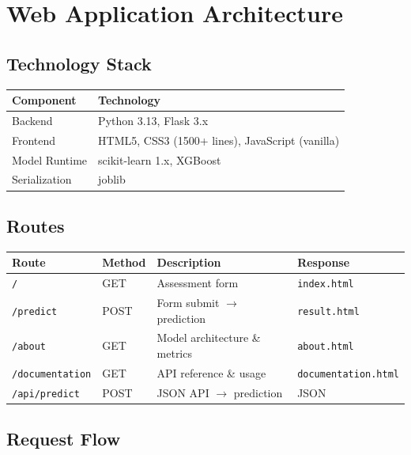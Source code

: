 \documentclass[11pt,a4paper]{article}
\begin{document}
\section{Web Application Architecture}

\subsection{Technology Stack}

\begin{tabularx}{\textwidth}{l X}
\hline
\textbf{Component} & \textbf{Technology} \\
\hline
Backend & Python 3.13, Flask 3.x \\
Frontend & HTML5, CSS3 (1500+ lines), JavaScript (vanilla) \\
Model Runtime & scikit-learn 1.x, XGBoost \\
Serialization & joblib \\
\hline
\end{tabularx}

\subsection{Routes}

\begin{tabularx}{\textwidth}{l l l X}
\hline
\textbf{Route} & \textbf{Method} & \textbf{Description} & \textbf{Response} \\
\hline
\texttt{/} & GET & Assessment form & \texttt{index.html} \\
\texttt{/predict} & POST & Form submit $\rightarrow$ prediction & \texttt{result.html} \\
\texttt{/about} & GET & Model architecture \& metrics & \texttt{about.html} \\
\texttt{/documentation} & GET & API reference \& usage & \texttt{documentation.html} \\
\texttt{/api/predict} & POST & JSON API $\rightarrow$ prediction & JSON \\
\hline
\end{tabularx}

\subsection{Request Flow}
\end{document}
